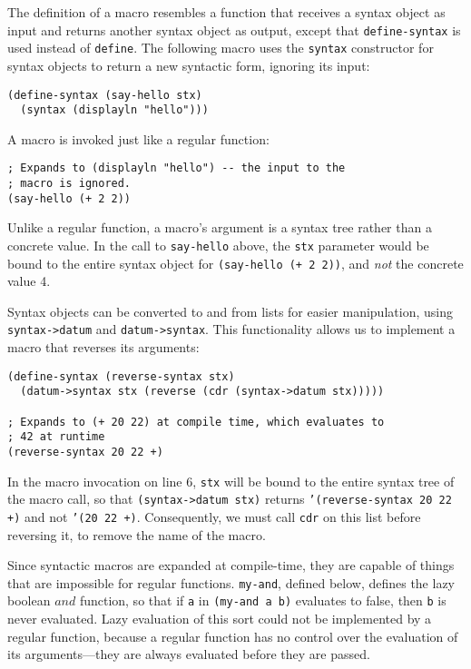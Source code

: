 \documentclass{article}
\begin{document}
The definition of a macro resembles a function that receives a syntax object as input and returns another syntax object as output, except that \texttt{define-syntax} is used instead of \texttt{define}. The following macro uses the \texttt{syntax} constructor for syntax objects to return a new syntactic form, ignoring its input:

\begin{lstlisting}
(define-syntax (say-hello stx)
  (syntax (displayln "hello")))
\end{lstlisting}

A macro is invoked just like a regular function:

\begin{lstlisting}
; Expands to (displayln "hello") -- the input to the
; macro is ignored.
(say-hello (+ 2 2))
\end{lstlisting}

Unlike a regular function, a macro's argument is a syntax tree rather than a concrete value. In the call to \texttt{say-hello} above, the \texttt{stx} parameter would be bound to the entire syntax object for \texttt{(say-hello (+ 2 2))}, and \textit{not} the concrete value 4.

Syntax objects can be converted to and from lists for easier manipulation, using \texttt{syntax->datum} and \texttt{datum->syntax}. This functionality allows us to implement a macro that reverses its arguments:

\begin{lstlisting}
(define-syntax (reverse-syntax stx)
  (datum->syntax stx (reverse (cdr (syntax->datum stx)))))

; Expands to (+ 20 22) at compile time, which evaluates to
; 42 at runtime
(reverse-syntax 20 22 +)
\end{lstlisting}

In the macro invocation on line 6, \texttt{stx} will be bound to the entire syntax tree of the macro call, so that \texttt{(syntax->datum stx)} returns \texttt{'(reverse-syntax 20 22 +)} and not \texttt{'(20 22 +)}. Consequently, we must call \texttt{cdr} on this list before reversing it, to remove the name of the macro.

Since syntactic macros are expanded at compile-time, they are capable of things that are impossible for regular functions. \texttt{my-and}, defined below, defines the lazy boolean $and$ function, so that if \texttt{a} in \texttt{(my-and a b)} evaluates to false, then \texttt{b} is never evaluated. Lazy evaluation of this sort could not be implemented by a regular function, because a regular function has no control over the evaluation of its arguments---they are always evaluated before they are passed.
\end{document}
